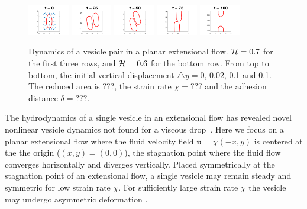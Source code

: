 \documentclass[prf,superscriptaddress,showkeys]{revtex4-1}
\newcommand{\uu}{\mathbf{u}}
\begin{document}
\begin{figure}[htp]
  \includegraphics[width = 0.16\textwidth,trim={4cm 0.5cm 4cm 0.5cm},clip]
    {figs/extensional_displacement1em1_adS6em1_image01.png}
  \includegraphics[width = 0.16\textwidth,trim={4cm 0.5cm 4cm 0.5cm},clip]
    {figs/extensional_displacement1em1_adS6em1_image02.png}
  \includegraphics[width = 0.16\textwidth,trim={4cm 0.5cm 4cm 0.5cm},clip]
    {figs/extensional_displacement1em1_adS6em1_image03.png}
  \includegraphics[width = 0.16\textwidth,trim={4cm 0.5cm 4cm 0.5cm},clip]
    {figs/extensional_displacement1em1_adS6em1_image04.png}
  \includegraphics[width = 0.16\textwidth,trim={4cm 0.5cm 4cm 0.5cm},clip]
    {figs/extensional_displacement1em1_adS6em1_image05.png}

  \caption{\label{fig:extensionalNonsymmetric}Dynamics of a vesicle pair in a planar extensional flow. ${\cal H} = 0.7$ for the first three rows, and ${\cal H}=0.6$ for the bottom row. From top to bottom, the initial vertical displacement $\triangle y=0$, 0.02, 0.1 and 0.1. The reduced area is ???, the strain rate $\chi = ???$ and the adhesion distance $\delta = ???$. }
  \end{figure}


The hydrodynamics of a single vesicle in an extensional flow has
revealed novel nonlinear vesicle dynamics not found for a viscous
drop~\cite{KantslerSegreSteinberg2008_PRL, ZhaoShaqfeh2013_JFM,
Narsimhan2014_JFM, DahlNarsimhanGouveia2016_SoftMatt}.  Here we focus on a
planar extensional flow  where the fluid velocity field $\uu=\chi(-x,y)$ is centered at the 
the origin ($(x,y)=(0,0)$), the stagnation point where the fluid flow converges horizontally and diverges vertically.
Placed symmetrically at the stagnation point of an extensional flow,
a single vesicle may remain steady and symmetric for low strain rate $\chi$.
For sufficiently large strain rate $\chi$ the vesicle may undergo asymmetric deformation \cite{KantslerSegreSteinberg2008_PRL,Narsimhan2014_JFM,DahlNarsimhanGouveia2016_SoftMatt}. 
\end{document}
